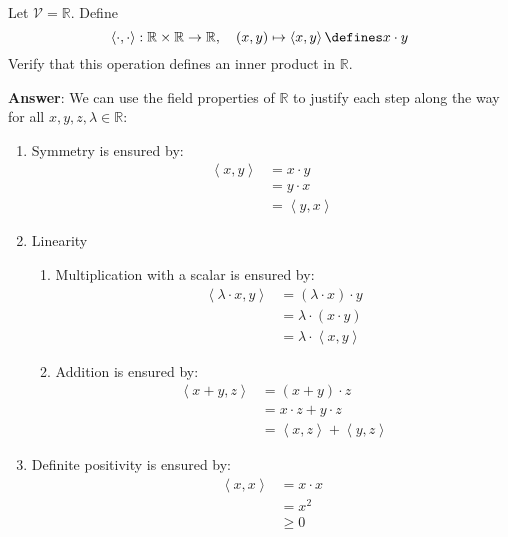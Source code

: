 \begin{exm}\label{exm-inner-product:1}
	Let $\mathcal{V}=\mathbb{R}$. Define
	\begin{equation}
		\left<\cdot,\cdot\right>:\mathbb{R}\times\mathbb{R}\to\mathbb{R},\quad(x,y)\mapsto\left<x,y\right>\defines x \cdot y
	\end{equation}
	Verify that this operation defines an inner product in $\mathbb{R}$.
	\begin{flushleft}
		\textbf{Answer}: We can use the field properties of $\mathbb{R}$ to justify
		each step along the way for all $x,y,z,\lambda\in\mathbb{R}$:
		\begin{enumerate}
			\item Symmetry is ensured by:
			      \begin{align*}
				      \left<x,y\right> & =x \cdot y         \\
				                       & = y \cdot x        \\
				                       & = \left<y,x\right>
			      \end{align*}
			\item Linearity
			      \begin{enumerate}
				      \item Multiplication with a scalar is ensured by:
				            \begin{align*}
					            \left<\lambda\cdot x,y\right> & = (\lambda\cdot x)\cdot y       \\
					                                          & = \lambda\cdot (x\cdot y)       \\
					                                          & = \lambda \cdot\left<x,y\right>
				            \end{align*}
				      \item Addition is ensured by:
				            \begin{align*}
					            \left<x+y,z\right> & = (x+y)\cdot z                       \\
					                               & = x \cdot z + y \cdot z              \\
					                               & =\left<x,z\right> + \left<y,z\right>
				            \end{align*}
			      \end{enumerate}
			\item Definite positivity is ensured by:
			      \begin{align*}
				      \left<x,x\right> & = x \cdot x \\
				                       & = x^2       \\
				                       & \geq 0
			      \end{align*}
		\end{enumerate}
	\end{flushleft}
\end{exm}

